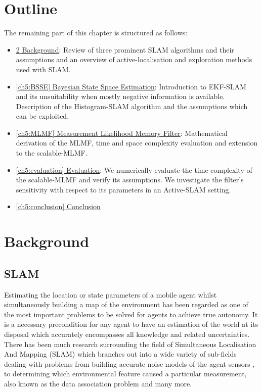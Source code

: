 \section{Outline}


The remaining part of this chapter is structured as follows:


\begin{itemize}
 \item \hyperref[ch5:background]{\ref{ch5:background} Background}: Review of three prominent SLAM algorithms
 and their assumptions and an overview of active-localisation and exploration methods used with SLAM.
 \item \hyperref[ch5:BSSE]{\ref{ch5:BSSE} Bayesian State Space Estimation}:  Introduction to EKF-SLAM and
 its unsuitability when mostly negative information is available. Description 
 of the Histogram-SLAM algorithm and the assumptions which can be exploited.
 \item \hyperref[ch5:MLMF]{\ref{ch5:MLMF} Measurement Likelihood Memory Filter}:
 Mathematical derivation of the MLMF, time and space complexity evaluation and extension to 
 the scalable-MLMF.
 \item \hyperref[ch5:evaluation]{\ref{ch5:evaluation} Evaluation}:
 We numerically evaluate the time complexity of the scalable-MLMF and verify its assumptions.
 We investigate the filter's sensitivity with respect to its parameters in an Active-SLAM setting.
 \item \hyperref[ch5:conclusion]{\ref{ch5:conclusion} Conclusion}
\end{itemize}

\section{Background}\label{ch5:background}

\subsection{SLAM}

Estimating the location or state parameters of a mobile agent whilst simultaneously building a map of the environment has been
regarded as one of the most important problems to be solved for agents to achieve true autonomy. It is a necessary precondition for 
any agent to have an estimation of the world at its disposal which accurately encompasses all knowledge and related uncertainties. 
There has been much research surrounding the field of Simultaneous Localisation And Mapping (SLAM) which branches out into a wide variety of sub-fields 
dealing with problems from building accurate noise models of the agent sensors \cite{Plagemann07gaussianbeam}, to determining which environmental 
feature caused a particular measurement, also known as the data association problem \cite{DataAssociation2003} and many more. 

